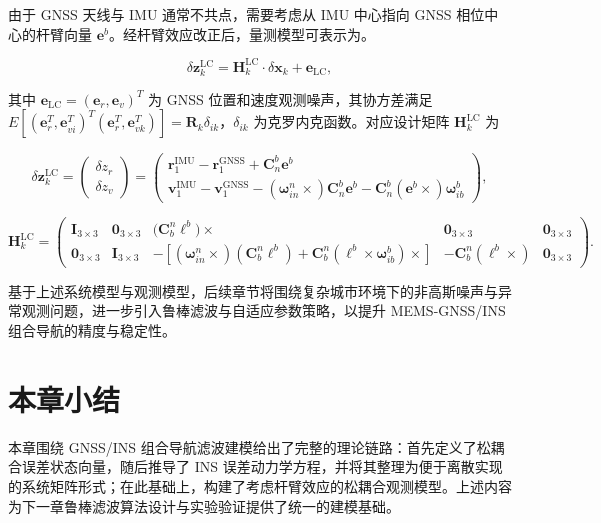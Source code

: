 由于 GNSS 天线与 IMU 通常不共点，需要考虑从 IMU 中心指向 GNSS 相位中心的杆臂向量 $\bm{e}^b$。经杆臂效应改正后，量测模型可表示为。

\begin{equation}
    \delta \bm{z}_k^{\text{LC}} = \bm{H}_k^{\text{LC}} \cdot \delta \bm{x}_k + \bm{e}_{\text{LC}},
\end{equation}

其中 $\bm{e}_{\text{LC}} = (\bm{e}_r, \bm{e}_v)^T$ 为 GNSS 位置和速度观测噪声，其协方差满足
$E[(\bm{e}_r^T, \bm{e}_{vi}^T)^T(\bm{e}_r^T, \bm{e}_{vk}^T)] = \bm{R}_k\delta_{ik}$，$\delta_{ik}$ 为克罗内克函数。对应设计矩阵 $\bm{H}_k^{\text{LC}}$ 为

\begin{equation}
    \delta \bm{z}_k^{\text{LC}} =
    \begin{pmatrix}
        \delta z_r \\[2pt]
        \delta z_v
    \end{pmatrix}
    =
    \begin{pmatrix}
        \bm{r}_1^{\text{IMU}} - \bm{r}_1^{\text{GNSS}} + \bm{C}_n^b \bm{e}^b \\[4pt]
        \bm{v}_1^{\text{IMU}} - \bm{v}_1^{\text{GNSS}} - (\bm{\omega}_{in}^n \times) \bm{C}_n^b \bm{e}^b - \bm{C}_n^b (\bm{e}^b \times) \bm{\omega}_{ib}^b
    \end{pmatrix},
\end{equation}

\begin{equation}
    \bm{H}_k^{\text{LC}} =
    \begin{pmatrix}
        \bm{I}_{3 \times 3} & \bm{0}_{3 \times 3} & \bigl(\bm{C}_{b}^n \bm{\ell}^b\bigr)\times & \bm{0}_{3 \times 3} & \bm{0}_{3 \times 3} \\
        \bm{0}_{3 \times 3} & \bm{I}_{3 \times 3} & - \left[\left(\bm{\omega}_{in}^n\times\right)\left(\bm{C}_b^n\ell^b\right)+\bm{C}_b^n\left(\ell^b\times\bm{\omega}_{ib}^b\right)\times \right] & -\bm{C}_b^n\left(\ell^b\times\right) & \bm{0}_{3 \times 3}
    \end{pmatrix}.
\end{equation}

基于上述系统模型与观测模型，后续章节将围绕复杂城市环境下的非高斯噪声与异常观测问题，进一步引入鲁棒滤波与自适应参数策略，以提升 MEMS-GNSS/INS 组合导航的精度与稳定性。

\section{本章小结}

本章围绕 GNSS/INS 组合导航滤波建模给出了完整的理论链路：首先定义了松耦合误差状态向量，随后推导了 INS 误差动力学方程，并将其整理为便于离散实现的系统矩阵形式；在此基础上，构建了考虑杆臂效应的松耦合观测模型。上述内容为下一章鲁棒滤波算法设计与实验验证提供了统一的建模基础。

